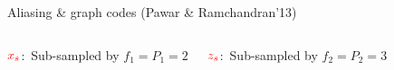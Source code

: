 \documentclass[10pt,xcolor=table]{beamer}
\begin{document}
	\begin{frame}{Aliasing \& graph codes (Pawar \& Ramchandran'13)}
	
		\begin{block}{}
			\begin{figure}[t]
				\begin{center}
					\resizebox{1.0\textwidth}{!}{}
				\end{center}
			\end{figure}
		\end{block}
		\pause
		\begin{columns}
			
			\column{.47\textwidth}
			\begin{block}{{\small $\color{red}x_s$:\ Sub-sampled by $f_1=P_1=2$}}
					\begin{figure}[t]
					\begin{center}
						\resizebox{1.0\textwidth}{!}{}
					\end{center}
				\end{figure}
			\end{block}
			\pause
			\begin{block}{{\small$\color{red}z_s$:\ Sub-sampled by $f_2=P_2=3$}}
				

\end{block}
\end{columns}
\end{frame}
\end{document}
